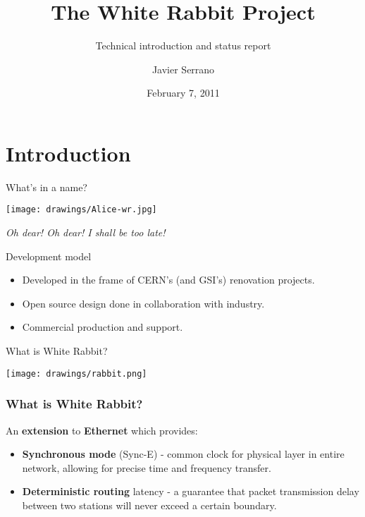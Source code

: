 \documentclass[compress,red]{beamer}
\title[WR Project Status\hspace{2em}\insertframenumber/
\inserttotalframenumber]{The White Rabbit Project}
\subtitle{Technical introduction and status report}
\author{Javier Serrano}
\date{February 7, 2011}
\institute%
{
  BE-CO Hardware and Timing section\\
  CERN, Geneva, Switzerland
 }
\begin{document}
\frame{\titlepage}


\section{Introduction}
\begin{frame}{What's in a name?}
\begin{center}
\texttt{[image: drawings/Alice-wr.jpg]}

\textit{Oh dear! Oh dear! I shall be too late!}\\
\end{center}
\end{frame}


\begin{frame}{Development model}
\begin{itemize}
\item Developed in the frame of CERN's (and GSI's) renovation projects.
\item Open source design done in collaboration with industry.
\item Commercial production and support.
\end{itemize}
\end{frame}


\begin{frame}{What is White Rabbit?}
\begin{center}
\texttt{[image: drawings/rabbit.png]}
\end{center}
\end{frame}

\frame
{
  \frametitle{What is White Rabbit?}

\begin{block}{}
  An \textbf{extension} to \textbf{Ethernet} which provides:
  \begin{itemize}
  \item \textbf{Synchronous mode} (Sync-E) - common clock for physical layer in entire network, allowing for precise time and frequency transfer.

\item \textbf{Deterministic routing} latency - a guarantee that packet transmission delay between two stations will never exceed a certain boundary.
\end{itemize}
\end{block}

}
\end{document}
